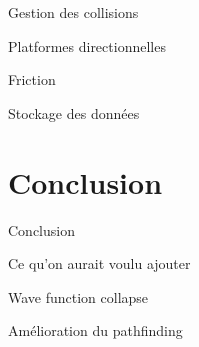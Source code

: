 \documentclass{beamer}
\begin{document}
{\begin{frame}{Gestion des collisions}
\end{frame}

\begin{frame}{Platformes directionnelles}

\end{frame}

\begin{frame}{Friction}

\end{frame}

\begin{frame}{Stockage des données}

\end{frame}

\section{Conclusion}
\begin{frame}{Conclusion}

\end{frame}

\begin{frame}{Ce qu'on aurait voulu ajouter}

\end{frame}

\begin{frame}{Wave function collapse}

\end{frame}

\begin{frame}{Amélioration du pathfinding}

\end{frame}

}
\end{document}
